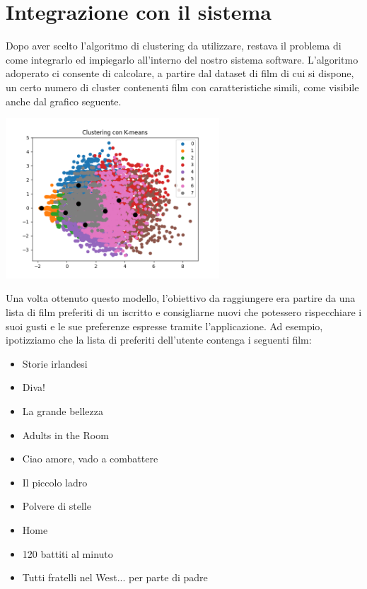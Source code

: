 \documentclass[a4paper, 10pt]{report}
\begin{document}
        \section{Integrazione con il sistema}\label{sec:integrazione-con-il-sistema}
            Dopo aver scelto l'algoritmo di clustering da utilizzare, restava il problema di come integrarlo ed impiegarlo all'interno
            del nostro sistema software.
            L'algoritmo adoperato ci consente di calcolare, a partire dal dataset di film di cui si dispone, un certo numero di cluster
            contenenti film con caratteristiche simili, come visibile anche dal grafico seguente.
            \begin{center}
                \includegraphics[width=8cm]{modelling/ClusterK-Means}\\
            \end{center}
            Una volta ottenuto questo modello, l'obiettivo da raggiungere era partire da una lista di film preferiti di un iscritto
            e consigliarne nuovi che potessero rispecchiare i suoi gusti e le sue preferenze espresse tramite l'applicazione.
            Ad esempio, ipotizziamo che la lista di preferiti dell'utente contenga i seguenti film:
            \begin{itemize}
                \item Storie irlandesi
                \item Diva!
                \item La grande bellezza
                \item Adults in the Room
                \item Ciao amore, vado a combattere
                \item Il piccolo ladro
                \item Polvere di stelle
                \item Home
                \item 120 battiti al minuto
                \item Tutti fratelli nel West... per parte di padre
            \end{itemize}
\end{document}
